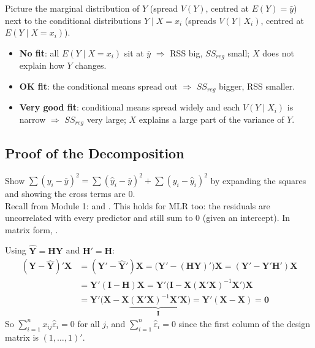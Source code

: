 \begin{remark}
    Picture the marginal distribution of $Y$ (spread $V(Y)$, centred at $E(Y)=\bar y$) next to
    the conditional distributions $Y\mid X=x_i$ (spreads $V(Y\mid X_i)$, centred at $E(Y\mid X=x_i)$).
    \begin{itemize}
        \item \textbf{No fit}: all $E(Y\mid X=x_i)$ sit at $\bar y$ $\Rightarrow$ RSS big, $SS_{reg}$
        small; $X$ does not explain how $Y$ changes.
        \item \textbf{OK fit}: the conditional means spread out $\Rightarrow$ $SS_{reg}$ bigger, RSS smaller.
        \item \textbf{Very good fit}: conditional means spread widely and each $V(Y\mid X_i)$ is
        narrow $\Rightarrow$ $SS_{reg}$ very large; $X$ explains a large part of the variance of $Y$.
    \end{itemize}
\end{remark}

\subsection{Proof of the Decomposition}

\begin{remark}[Strategy]
    Show $\sum(y_i-\bar y)^2=\sum(\hat y_i-\bar y)^2+\sum(y_i-\hat y_i)^2$ by expanding the
    squares and showing the cross terms are 0. 
    \\ Recall from Module 1:  and
    . This holds for MLR too: the residuals are
    uncorrelated with every predictor and still sum to 0 (given an intercept). In matrix
    form, .
\end{remark}

\begin{proposition}[$\hat{\boldsymbol\epsilon}'\mathbf{X}=\mathbf{0}$]
    Using $\hat{\mathbf{Y}}=\mathbf{H}\mathbf{Y}$ and $\mathbf{H}'=\mathbf{H}$:
    \begin{align*}
        (\mathbf{Y}-\hat{\mathbf{Y}})'\mathbf{X}
        &=(\mathbf{Y}'-\hat{\mathbf{Y}}')\mathbf{X}=\big(\mathbf{Y}'-(\mathbf{H}\mathbf{Y})'\big)\mathbf{X}=(\mathbf{Y}'-\mathbf{Y}'\mathbf{H}')\mathbf{X}\\
        &=\mathbf{Y}'(\mathbf{I}-\mathbf{H})\mathbf{X}=\mathbf{Y}'\big(\mathbf{I}-\mathbf{X}(\mathbf{X}'\mathbf{X})^{-1}\mathbf{X}'\big)\mathbf{X}\\
        &=\mathbf{Y}'\big(\mathbf{X}-\mathbf{X}\underbrace{(\mathbf{X}'\mathbf{X})^{-1}\mathbf{X}'\mathbf{X}}_{\mathbf{I}}\big)=\mathbf{Y}'(\mathbf{X}-\mathbf{X})=\mathbf{0}
    \end{align*}
    So $\sum_{i=1}^n x_{ij}\hat\varepsilon_i=0$ for all $j$, and $\sum_{i=1}^n\hat\varepsilon_i=0$
    since the first column of the design matrix is $(1,\dots,1)'$.
\end{proposition}

